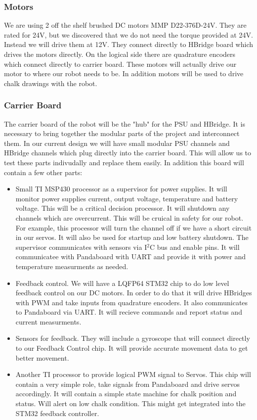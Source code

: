 \documentclass[12pt]{article}
\begin{document}
     \subsubsection{Motors}
     We are using 2 off the shelf brushed DC motors MMP D22-376D-24V. They are rated for 24V, but we discovered that we do not need the torque provided at 24V. Instead we will drive them at 12V. They connect directly to HBridge board which drives the motors directly.  On the logical side there are quadrature encoders which connect directly to carrier board. These motors will actually drive our motor to where our robot needs to be. In addition motors will be used to drive chalk drawings with the robot.
     \subsubsection{Carrier Board}
     The carrier board of the robot will be the "hub" for the PSU and HBridge. It is necessary to bring together the modular parts of the project and interconnect them. In our current design we will have small modular PSU channels and HBridge channels which plug directly into the carrier board. This will allow us to test these parts indivudally and replace them easily. In addition this board will contain a few other parts:
     \begin{itemize}
    \item Small TI MSP430 processor as a supervisor for power supplies. It will monitor power supplies current, output voltage, temperature and battery voltage. This will be a critical decision processor. It will shutdown any channels which are overcurrent. This will be cruical in safety for our robot. For example, this processor will turn the channel off if we have a short circuit in our servos. It will also be used for startup and low battery shutdown. The supervisor communicates with sensors via I$^{\textrm{2}}$C bus and enable pins. It will communicatee with Pandaboard with UART and provide it with power and temperature measurments as needed.
    \item Feedback control. We will have a LQFP64 STM32 chip to do low level feedback control on our DC motors. In order to do that it will drive HBridges with PWM and take inputs from quadrature encoders. It also communicates to Pandaboard via UART. It will recieve commands and report status and current measurments. 
    \item Sensors for feedback. They will include a gyroscope that will connect directly to our Feedback Control chip. It will provide accurate movement data to get better movement.
    \item Another TI processor to provide logical PWM signal to Servos. This chip will contain a very simple role, take signals from Pandaboard and drive servos accordingly. It will contain a simple state machine for chalk position and status. Will alert on low chalk condition. This might get integrated into the STM32 feedback controller.
     \end{itemize}
\end{document}
